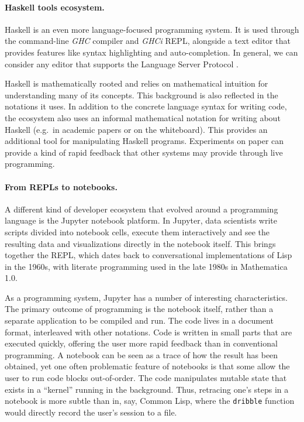 \paragraph{Haskell tools ecosystem.}

Haskell is an even more language-focused programming system. It is used
through the command-line \emph{GHC} compiler and \emph{GHCi} REPL,
alongside a text editor that provides features like syntax highlighting
and auto-completion. In general, we can consider any editor that
supports the Language Server Protocol \cite{LSP}.

Haskell is mathematically rooted and relies on mathematical intuition
for understanding many of its concepts. This background is also
reflected in the notations it uses. In addition to the concrete language
syntax for writing code, the ecosystem also uses an informal
mathematical notation for writing about Haskell (e.g.~in academic papers
or on the whiteboard). This provides an additional tool for manipulating
Haskell programs. Experiments on paper can provide a kind of rapid
feedback that other systems may provide through live programming.

\paragraph{From REPLs to notebooks.}

A different kind of developer ecosystem that evolved around a
programming language is the Jupyter notebook platform. In Jupyter, data
scientists write scripts divided into notebook cells, execute them
interactively and see the resulting data and visualizations directly in
the notebook itself. This brings together the REPL, which dates back to
conversational implementations of Lisp in the 1960s, with literate
programming \cite{LiterateProg} used in the late 1980s in Mathematica
1.0.

As a programming system, Jupyter has a number of interesting
characteristics. The primary outcome of programming is the notebook
itself, rather than a separate application to be compiled and run. The
code lives in a document format, interleaved with other notations. Code
is written in small parts that are executed quickly, offering the user
more rapid feedback than in conventional programming. A notebook can be
seen as a trace of how the result has been obtained, yet one often
problematic feature of notebooks is that some allow the user to run code
blocks out-of-order. The code manipulates mutable state that exists in a
``kernel'' running in the background. Thus, retracing one's steps in a
notebook is more subtle than in, say, Common Lisp, where the
\texttt{dribble} function would directly record the user's session to a
file.

